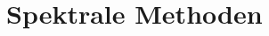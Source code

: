 \chapter{Spektrale Methoden\label{chapter:klima}}
\begin{refsection}

\printbibliography[heading=subbibliography]
\end{refsection}

